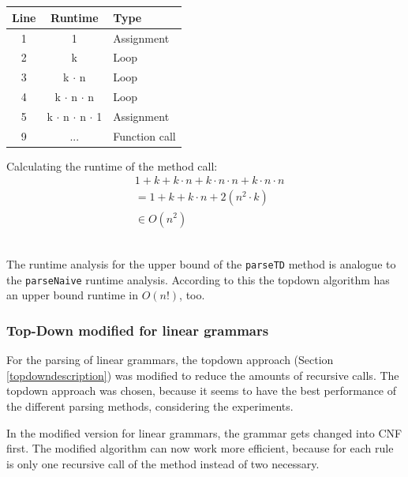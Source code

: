 \documentclass[a4paper, 11pt]{article}
\begin{document}
\ \\ \\
\begin{minipage}{0.5\textwidth}

\begin{tabular}{|c|c|l|}
\hline
Line & Runtime & Type \\
\hline
1 &  1 & Assignment \\
2 & k & Loop \\
3 & k $\cdot$ n & Loop \\
4 & k $\cdot$ n $\cdot$ n &  Loop\\
5 & k $\cdot$ n $\cdot$ n $\cdot$ 1 & Assignment\\
9 & ... & Function call\\
\hline
\end{tabular}


\end{minipage}\begin{minipage}{0.5\textwidth}
Calculating the runtime of the method call:
\begin{align*}
& 1 + k + k \cdot n + k \cdot n \cdot n + k \cdot n \cdot n \\
& = 1 + k + k \cdot n + 2(n^2 \cdot k) \\
& \in O(n^2)
\end{align*}
\end{minipage}
\ \\

The runtime analysis for the upper bound of the \texttt{parseTD} method is analogue to the \texttt{parseNaive} runtime analysis. According to this the topdown algorithm has an upper bound runtime in $O(n!)$, too.



\subsubsection{Top-Down modified for linear grammars}
\label{lineartopdown}

For the parsing of linear grammars, the topdown approach (Section \ref{topdowndescription}) was modified to reduce the amounts of recursive calls. The topdown approach was chosen, because it seems to have the best performance of the different parsing methods, considering the experiments.

In the modified version for linear grammars, the grammar gets changed into CNF first. The modified algorithm can now work more efficient, because for each rule is only one recursive call of the method instead of two necessary.
\end{document}
